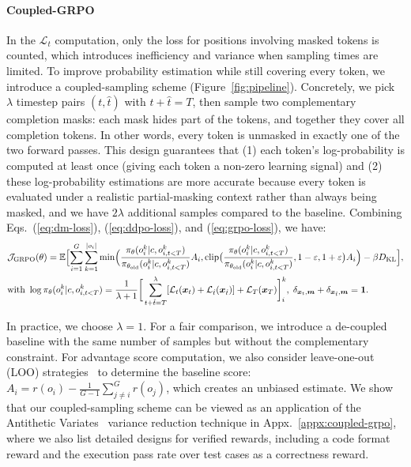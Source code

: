 \paragraph{Coupled-GRPO}
In the $\mathcal{L}_{t}$ computation, only the loss for positions involving masked tokens is counted, which introduces inefficiency and variance when sampling times are limited. 
To improve probability estimation while still covering every token, we introduce a coupled-sampling scheme (Figure~\ref{fig:pipeline}). 
Concretely, we pick $\lambda$ timestep pairs $(t, \hat{t})$ with $t+\hat{t}=T$, then sample two complementary completion masks: each mask hides part of the tokens, and together they cover all completion tokens. 
In other words, every token is unmasked in exactly one of the two forward passes. 
This design guarantees that (1) each token's log-probability is computed at least once (giving each token a non-zero learning signal) and (2) these log-probability estimations are more accurate because every token is evaluated under a realistic partial-masking context rather than always being masked, and we have $2\lambda$ additional samples compared to the baseline. Combining Eqs.~(\ref{eq:dm-loss}), (\ref{eq:ddpo-loss}), and (\ref{eq:grpo-loss}), we have:
{
\small
\begin{align}
&\mathcal J_{\text{GRPO}}(\theta)= 
\mathbb E\Bigl[\sum_{i=1}^G\sum_{k=1}^{|o_i|}
  \min\Bigl(\frac{\pi_\theta(o_i^k| c,o_{i,t<T}^k)}{\pi_{\theta_\text{old}}(o_i^k| c,o_{i,t<T}^k)} A_i,\mathrm{clip}\bigl(\frac{\pi_\theta(o_i^k| c,o_{i,t<T}^k)}{\pi_{\theta_\text{old}}(o_i^k|c,o_{i,t<T}^k)},1-\varepsilon,1+\varepsilon\bigr)A_i\Bigr)-\beta D_{\mathrm{KL}}\Bigr],\notag\\
  &\text{with }\log\pi_\theta(o_{i}^k| c,o_{i,t<T}^k) = \frac{1}{\lambda+1}\bigg[\sum_{t+\hat{t}=T}^{\lambda}[\mathcal{L}_{t}(\bm{x}_t) + \mathcal{L}_{\hat{t}}(\bm{x}_{\hat{t}})] + \mathcal{L}_{T}(\bm{x}_T)\bigg]_i^k, \;\delta_{\bm{x}_t,\bm{m}}+\delta_{\bm{x}_{\hat{t}},\bm{m}}=\bm{1}.
  \label{eq:grpo-loss-cp}
\end{align}
}

In practice, we choose $\lambda=1$. For a fair comparison, we introduce a de-coupled baseline with the same number of samples but without the complementary constraint.
For advantage score computation, we also consider leave-one-out (LOO) strategies~\citep{ahmadian2024back,kool2019buy} to determine the baseline score: $A_i=r(o_i)-\frac1{G-1}\sum_{j\neq i}^{G} r(o_j)$, which creates an unbiased estimate. 
We show that our coupled-sampling scheme can be viewed as an application of the Antithetic Variates~\citep{hammersley1956general} variance reduction technique in Appx.~\ref{appx:coupled-grpo}, where we also list detailed designs for verified rewards, including a code format reward and the execution pass rate over test cases as a correctness reward.

